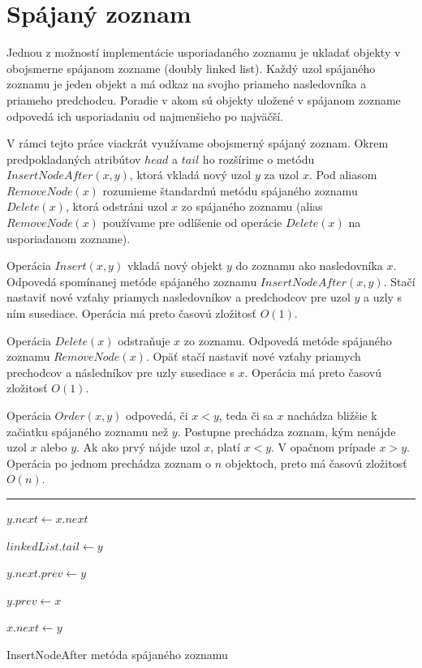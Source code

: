 \documentclass[
  digital,     %
  oneside,     %
  nosansbold,  %
  nocolorbold, %
  lof,         %
  lot,         %
]{fithesis4}
\begin{document}
\chapter{Spájaný zoznam}

Jednou z možností implementácie usporiadaného zoznamu je ukladať objekty v obojsmerne spájanom zozname (doubly linked list). Každý uzol spájaného zoznamu je jeden objekt a má odkaz na svojho priameho nasledovníka a priameho predchodcu. Poradie v akom sú objekty uložené v spájanom zozname odpovedá ich usporiadaniu od najmenšieho po najväčší.

V rámci tejto práce viackrát využívame obojsmerný spájaný zoznam. Okrem predpokladaných atribútov $head$ a $tail$ ho rozšírime o metódu $InsertNodeAfter(x, y)$, ktorá vkladá nový uzol $y$ za uzol $x$. Pod aliasom $RemoveNode(x)$ rozumieme štandardnú metódu spájaného zoznamu $Delete(x)$, ktorá odstráni uzol $x$ zo spájaného zoznamu (alias $RemoveNode(x)$ používame pre odlíšenie od operácie $Delete(x)$ na usporiadanom zozname).

Operácia $Insert(x, y)$ vkladá nový objekt $y$ do zoznamu ako nasledovníka $x$. Odpovedá spomínanej metóde spájaného zoznamu $InsertNodeAfter(x, y)$. Stačí nastaviť nové vzťahy priamych nasledovníkov a predchodcov pre uzol $y$ a uzly s ním susediace. Operácia má preto časovú zložitosť $O(1)$.

Operácia $Delete(x)$ odstraňuje $x$ zo zoznamu. Odpovedá metóde spájaného zoznamu $RemoveNode(x)$.  Opäť stačí nastaviť nové vzťahy priamych prechodcov a následníkov pre uzly susediace s $x$. Operácia má preto časovú zložitosť $O(1)$.

Operácia $Order(x, y)$ odpovedá, či $x < y$, teda či sa $x$ nachádza bližšie k začiatku spájaného zoznamu než $y$. Postupne prechádza zoznam, kým nenájde uzol $x$ alebo $y$. Ak ako prvý nájde uzol $x$, platí $x < y$. V opačnom prípade $x > y$. Operácia po jednom prechádza zoznam o $n$ objektoch, preto má časovú zložitosť $O(n)$.


\begin{algorithm}
\hrule\vspace{0.2em}
$y.next \leftarrow x.next$\;

{
    $linkedList.tail \leftarrow y$\;
}

\Else
{
    $y.next.prev \leftarrow y$\;
}

$y.prev \leftarrow x$\;

$x.next \leftarrow y$\;

\caption{InsertNodeAfter metóda spájaného zoznamu}
\end{algorithm}
\end{document}
